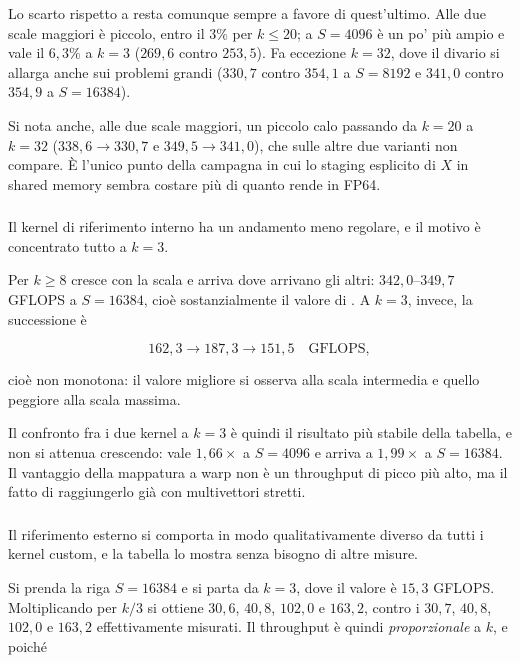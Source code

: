 Lo scarto rispetto a  resta comunque sempre a favore di
quest'ultimo. Alle due scale maggiori è piccolo, entro il $3\%$ per $k\le20$;
a $S=4096$ è un po' più ampio e vale il $6{,}3\%$ a $k=3$ ($269{,}6$ contro
$253{,}5$). Fa eccezione $k=32$, dove il divario si allarga anche sui problemi
grandi ($330{,}7$ contro $354{,}1$ a $S=8192$ e $341{,}0$ contro $354{,}9$ a
$S=\num{16384}$).

Si nota anche, alle due scale maggiori, un piccolo calo passando da $k=20$ a
$k=32$ ($338{,}6 \rightarrow 330{,}7$ e $349{,}5 \rightarrow 341{,}0$), che
sulle altre due varianti non compare. È l'unico punto della campagna in cui
lo staging esplicito di $X$ in shared memory sembra costare più di quanto
rende in FP64.

\subsubsection{}

Il kernel di riferimento interno ha un andamento meno regolare, e il motivo è
concentrato tutto a $k=3$.

Per $k\ge8$  cresce con la scala e arriva dove
arrivano gli altri: $342{,}0$–$349{,}7$ GFLOPS a $S=\num{16384}$, cioè
sostanzialmente il valore di . A $k=3$, invece, la
successione è

\[
162{,}3 \rightarrow 187{,}3 \rightarrow 151{,}5 \quad\text{GFLOPS},
\]

cioè non monotona: il valore migliore si osserva alla scala intermedia e quello
peggiore alla scala massima.

Il confronto fra i due kernel a $k=3$ è quindi il risultato più stabile della
tabella, e non si attenua crescendo:  vale
$1{,}66\times$ a $S=4096$ e arriva a $1{,}99\times$ a $S=\num{16384}$. Il
vantaggio della mappatura a warp non è un throughput di picco più alto, ma il
fatto di raggiungerlo già con multivettori stretti.

\subsubsection{}

Il riferimento esterno si comporta in modo qualitativamente diverso da tutti i
kernel custom, e la tabella lo mostra senza bisogno di altre misure.

Si prenda la riga $S=\num{16384}$ e si parta da $k=3$, dove il valore è
$15{,}3$ GFLOPS. Moltiplicando per $k/3$ si ottiene $30{,}6$, $40{,}8$,
$102{,}0$ e $163{,}2$, contro i $30{,}7$, $40{,}8$, $102{,}0$ e $163{,}2$
effettivamente misurati. Il throughput è quindi \emph{proporzionale} a $k$, e
poiché

